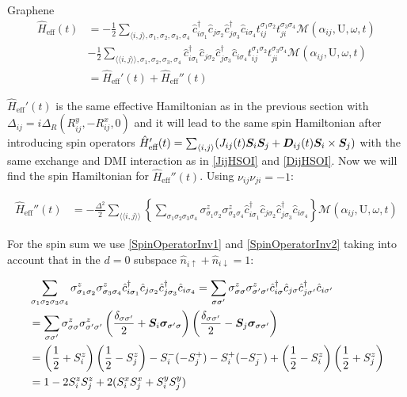 \begin{section}{Graphene}
\begin{align*}
\hat{H}_{\text{eff}}(t) &= - \frac{1}{2} \sum_{\langle i,j \rangle, \sigma_1, \sigma_2, \sigma_3, \sigma_4}\hat{c}_{i \sigma_1}^\dagger \hat{c}_{j \sigma_2} \hat{c}_{j \sigma_3}^\dagger \hat{c}_{i \sigma_4} t_{ij}^{\sigma_1 \sigma_2} t_{ji}^{\sigma_3 \sigma_4} \mathcal{M}(\alpha_{ij}, \text{U}, \omega, t) \\
& - \frac{1}{2} \sum_{\langle \langle i,j \rangle \rangle, \sigma_1, \sigma_2, \sigma_3, \sigma_4}\hat{c}_{i \sigma_1}^\dagger \hat{c}_{j \sigma_2} \hat{c}_{j \sigma_3}^\dagger \hat{c}_{i \sigma_4} t_{ij}^{\sigma_1 \sigma_2} t_{ji}^{\sigma_3 \sigma_4} \mathcal{M}(\alpha_{ij}, \text{U}, \omega, t) \\
&= \hat{H}_{\text{eff}}'(t) + \hat{H}_{\text{eff}}''(t)
\end{align*}

$\hat{H}_{\text{eff}}'(t)$ is the same effective Hamiltonian as in the previous section with $\Delta_{ij} = i\Delta_R (R_{ij}^y, - R_{ij}^x, 0)$ and it will lead to the same spin Hamiltonian after introducing spin operators $\hat{H}_{\text{eff}}'(t) = \sum_{\langle i,j \rangle} (J_{ij}(t) \boldsymbol{S}_i\boldsymbol{S}_j + \boldsymbol{D}_{ij}(t)\boldsymbol{S}_i \times \boldsymbol{S}_j)$ with the same exchange and DMI interaction as in \ref{JijHSOI} and \ref{DijHSOI}. Now we will find the spin Hamiltonian for $\hat{H}_{\text{eff}}''(t)$. Using $\nu_{ij}\nu_{ji} = -1$:

\begin{align*}
\hat{H}_{\text{eff}}''(t) &= -\frac{\Delta^2}{2} \sum_{\langle \langle i,j \rangle \rangle} \left\{ \sum_{\sigma_1 \sigma_2 \sigma_3 \sigma_4} \sigma_{\sigma_1 \sigma_2}^z\sigma_{\sigma_3 \sigma_4}^z \hat{c}_{i\sigma_1}^\dagger\hat{c}_{j\sigma_2}\hat{c}_{j\sigma_3}^\dagger\hat{c}_{i\sigma_4} \right\} \mathcal{M}(\alpha_{ij}, \text{U}, \omega, t)
\end{align*}

For the spin sum we use \ref{SpinOperatorInv1} and \ref{SpinOperatorInv2} taking into account that in the $d=0$ subspace $\hat{n}_{i\uparrow}+\hat{n}_{i\downarrow} = 1$:

\begin{align*}
&\sum_{\sigma_1 \sigma_2 \sigma_3 \sigma_4} \sigma_{\sigma_1 \sigma_2}^z\sigma_{\sigma_3 \sigma_4}^z \hat{c}_{i\sigma_1}^\dagger\hat{c}_{j\sigma_2}\hat{c}_{j\sigma_3}^\dagger\hat{c}_{i\sigma_4} = \sum_{\sigma \sigma'} \sigma_{\sigma \sigma}^z\sigma_{\sigma' \sigma'}^z \hat{c}_{i\sigma}^\dagger\hat{c}_{j\sigma}\hat{c}_{j\sigma'}^\dagger\hat{c}_{i\sigma'} \\
&= \sum_{\sigma \sigma'} \sigma_{\sigma \sigma}^z\sigma_{\sigma' \sigma'}^z \left( \frac{\delta_{\sigma\sigma'}}{2} + \boldsymbol{S}_i\boldsymbol{\sigma}_{\sigma'\sigma}\right)\left( \frac{\delta_{\sigma\sigma'}}{2} - \boldsymbol{S}_j\boldsymbol{\sigma}_{\sigma\sigma'}\right) \\
&= \left( \frac{1}{2}+S_i^z \right) \left( \frac{1}{2}-S_j^z \right) - S_i^-(-S_j^+)-S_i^+(-S_j^-) + \left( \frac{1}{2}-S_i^z \right) \left( \frac{1}{2}+S_j^z \right) \\
&= 1-2S_i^zS_j^z+2(S_i^xS_j^x+S_i^yS_j^y)
\end{align*}


\end{section}
